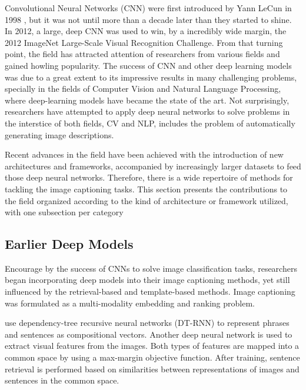 Convolutional Neural Networks (CNN) were first introduced by Yann LeCun in 1998 \citep{Lecun1998}, but it was not until more than a decade later than they started to shine. In 2012, a large, deep CNN \citep{Krizhevsky2012} was used to win, by a incredibly wide margin, the 2012 ImageNet Large-Scale Visual Recognition Challenge. From that turning point, the field has attracted attention of researchers from various fields and gained howling popularity. The success of CNN and other deep learning models was due to a great extent to its impressive results in many challenging problems, specially in the fields of Computer Vision and Natural Language Processing, where deep-learning models have became the state of the art. Not surprisingly, researchers have attempted to apply deep neural networks to solve problems in the interstice of both fields, CV and NLP, includes the problem of automatically generating image descriptions.

Recent advances in the field have been achieved with the introduction of new architectures and frameworks, accompanied by increasingly larger datasets to feed those deep neural networks. Therefore, there is a wide repertoire of methods for tackling the image captioning tasks. This section presents the contributions to the field organized according to the kind of architecture or framework utilized, with one subsection per category

\subsection{Earlier Deep Models}\label{subsec:earlier_deep-learning_models}

Encourage by the success of CNNs to solve image classification tasks, researchers began incorporating deep models into their image captioning methods, yet still influenced by the retrieval-based and template-based methods. Image captioning was formulated as a multi-modality embedding \citet{Frome2013} and ranking problem.

\citet{Socher2014} use dependency-tree recursive neural networks (DT-RNN) to represent phrases and sentences as compositional vectors. Another deep neural network \citep{Le2013} is used to extract visual features from the images. Both types of  features are mapped into a common space by using a max-margin objective function. After training, sentence retrieval is performed based on similarities between representations of images and sentences in the common space.

